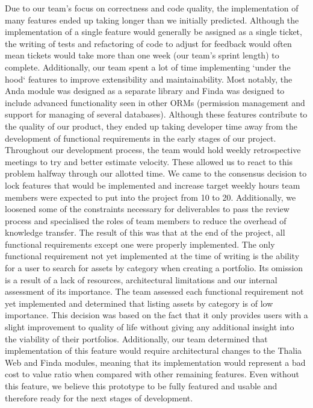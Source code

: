 \documentclass[main.tex]{subfiles}
\begin{document}
Due to our team's focus on correctness and code quality, the implementation of many features ended up taking longer than we initially predicted. Although the implementation of a single feature would generally be assigned as a single ticket, the writing of tests and refactoring of code to adjust for feedback would often mean tickets would take more than one week (our team's sprint length) to complete. Additionally, our team spent a lot of time implementing `under the hood` features to improve extensibility and maintainability. Most notably, the Anda module was designed as a separate library and Finda was designed to include advanced functionality seen in other ORMs (permission management and support for managing of several databases). Although these features contribute to the quality of our product, they ended up taking developer time away from the development of functional requirements in the early stages of our project.
Throughout our development process, the team would hold weekly retrospective meetings to try and better estimate velocity. These allowed us to react to this problem halfway through our allotted time. We came to the consensus decision to lock features that would be implemented and increase target weekly hours team members were expected to put into the project from 10 to 20. Additionally, we loosened some of the constraints necessary for deliverables to pass the review process and specialised the roles of team members to reduce the overhead of knowledge transfer. The result of this was that at the end of the project, all functional requirements except one were properly implemented.
The only functional requirement not yet implemented at the time of writing is the ability for a user to search for assets by category when creating a portfolio. Its omission is a result of a lack of resources, architectural limitations and our internal assessment of its importance. The team assessed each functional requirement not yet implemented and determined that listing assets by category is of low importance. This decision was based on the fact that it only provides users with a slight improvement to quality of life without giving any additional insight into the viability of their portfolios. Additionally, our team determined that implementation of this feature would require architectural changes to the Thalia Web and Finda modules, meaning that its implementation would represent a bad cost to value ratio when compared with other remaining features. 
Even without this feature, we believe this prototype to be fully featured and usable and therefore ready for the next stages of development.
\end{document}
